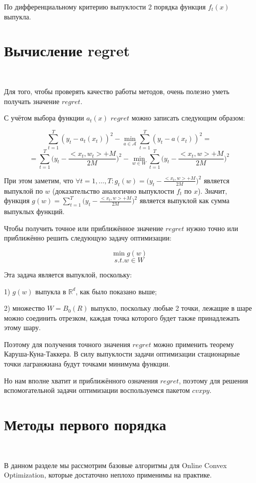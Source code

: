\documentclass[12pt]{article}
\begin{document}
По дифференциальному критерию выпуклости 2 порядка функция $f_t(x)$ выпукла. 

\section*{Вычисление regret}
$ $

Для того, чтобы проверять качество работы методов, очень полезно уметь получать значение $regret$.

С учётом выбора функции $a_t(x)$ $regret$ можно записать следующим образом:

$$\sum\limits_{t=1}^T (y_t-a_t(x_t))^2 - \min\limits_{a \in \mathcal{A}} \sum\limits_{t=1}^T (y_t-a(x_t))^2 =$$
$$= \sum\limits_{t=1}^T\bigg(y_t - \frac{<x_t, w_t>+M}{2M}\bigg)^2 - \min\limits_{w \in W}\sum\limits_{t=1}^T\bigg(y_t - \frac{<x_t, w>+M}{2M}\bigg)^2$$

При этом заметим, что $\forall t=1, \dots, T: g_t(w) = \bigg(y_t - \frac{<x_t, w>+M}{2M}\bigg)^2$ является выпуклой по $w$ (доказательство аналогично выпуклости $f_t$ по $x$).
Значит, функция $g(w) = \sum\limits_{t=1}^T\bigg(y_t - \frac{<x_t, w>+M}{2M}\bigg)^2$ является выпуклой как сумма выпуклых функций.

Чтобы получить точное или приближённое значение $regret$ нужно точно или приближённо решить следующую задачу оптимизации:

$$\min g(w)$$
$$s.t. w \in W$$

Эта задача является выпуклой, поскольку:

1) $g(w)$ выпукла в $\mathbb{R}^d$, как было показано выше;

2) множество $W = B_0(R)$ выпукло, поскольку любые 2 точки, лежащие в шаре можно соединить отрезком, каждая точка которого будет также принадлежать этому шару.


Поэтому для получения точного значения $regret$ можно применить теорему Каруша-Куна-Таккера. В силу выпуклости задачи  оптимизации стационарные точки лагранжиана будут точками минимума функции. 

Но нам вполне хватит и приближённого означения $regret$, поэтому для решения вспомогательной задачи оптимизации воспользуемся пакетом $cvxpy$.

\section*{Методы первого порядка}
$ $

В данном разделе мы рассмотрим базовые алгоритмы для Online Convex Optimization, которые достаточно неплохо применимы на практике.
\end{document}

